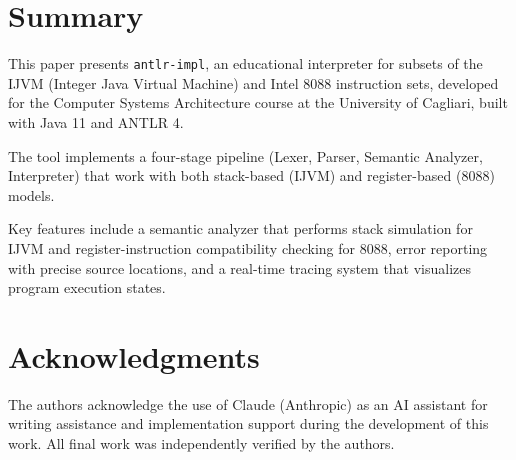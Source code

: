 \documentclass[11pt]{article}
\begin{document}
\section{Summary}
This paper presents \texttt{antlr-impl}, an educational interpreter for subsets of the IJVM (Integer Java Virtual Machine) and Intel 8088 instruction sets, developed for the Computer Systems Architecture course at the University of Cagliari, built with Java 11 and ANTLR 4.

The tool implements a four-stage pipeline (Lexer, Parser, Semantic Analyzer, Interpreter) that work with both stack-based (IJVM) and register-based (8088) models.

Key features include a semantic analyzer that performs stack simulation for IJVM and register-instruction compatibility checking for 8088, error reporting with precise source locations, and a real-time tracing system that visualizes program execution states.

\section*{Acknowledgments}
The authors acknowledge the use of Claude (Anthropic) as an AI assistant for writing assistance and implementation support during the development of this work. All final work was independently verified by the authors.



\end{document}

